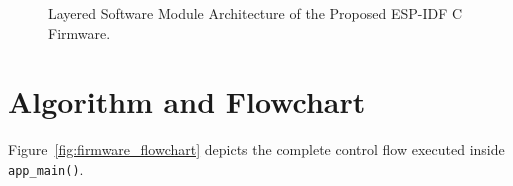 \documentclass[12pt,a4paper]{article}
\begin{document}
\begin{figure}[H]
{%
}
\caption{Layered Software Module Architecture of the Proposed ESP-IDF C Firmware.}
\label{fig:sw_architecture}
\end{figure}

\section{Algorithm and Flowchart}
\label{sec:algorithm_flowchart}

Figure~\ref{fig:firmware_flowchart} depicts the complete control flow executed inside \texttt{app\_main()}.
\end{document}
